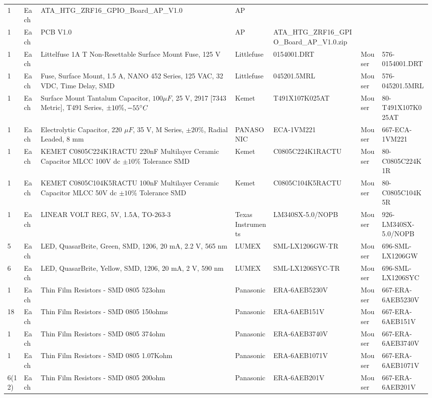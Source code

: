 \documentclass[12pt,a4paper,oneside]{article}
\begin{document}
\begin{landscape}
\begin{table}[H]
{\begin{tabular}{@{}lllllll@{}}
1 & Each & ATA\_HTG\_ZRF16\_GPIO\_Board\_AP\_V1.0 & AP\\
1 & Each & PCB V1.0 & AP & ATA\_HTG\_ZRF16\_GPIO\_Board\_AP\_V1.0.zip\\
1 & Each & Littelfuse 1A T Non-Resettable Surface Mount Fuse, 125 V & Littlefuse & 0154001.DRT & Mouser & 576-0154001.DRT\\
1 & Each & Fuse, Surface Mount, 1.5 A, NANO 452 Series, 125 VAC, 32 VDC, Time Delay, SMD & Littlefuse & 045201.5MRL & Mouser & 576-045201.5MRL\\
1 & Each & Surface Mount Tantalum Capacitor, $100 \mu F$, 25 V, 2917 [7343 Metric], T491 Series, $\pm 10\%, -55 \degree C$ & Kemet & T491X107K025AT & Mouser & 80-T491X107K025AT\\
1 & Each & Electrolytic Capacitor, 220 $\mu F$, 35 V, M Series, $\pm 20\%$, Radial Leaded, 8 mm & PANASONIC & ECA-1VM221 & Mouser & 667-ECA-1VM221\\
1 & Each & KEMET C0805C224K1RACTU 220nF Multilayer Ceramic Capacitor MLCC 100V dc $\pm 10\%$ Tolerance SMD & Kemet & C0805C224K1RACTU & Mouser & 80-C0805C224K1R\\
1 & Each & KEMET C0805C104K5RACTU 100nF Multilayer Ceramic Capacitor MLCC 50V dc $\pm 10\%$ Tolerance SMD & Kemet & C0805C104K5RACTU & Mouser & 80-C0805C104K5R\\
1 & Each &  LINEAR VOLT REG, 5V, 1.5A, TO-263-3 & Texas Instruments & LM340SX-5.0/NOPB & Mouser & 926-LM340SX-5.0/NOPB\\
5 & Each & LED, QuasarBrite, Green, SMD, 1206, 20 mA, 2.2 V, 565 nm & LUMEX & SML-LX1206GW-TR  & Mouser & 696-SML-LX1206GW\\
6 & Each & LED, QuasarBrite, Yellow, SMD, 1206, 20 mA, 2 V, 590 nm & LUMEX & SML-LX1206SYC-TR & Mouser & 696-SML-LX1206SYC\\
1 & Each & Thin Film Resistors - SMD 0805 523ohm & Panasonic & ERA-6AEB5230V & Mouser & 667-ERA-6AEB5230V\\
18 & Each & Thin Film Resistors - SMD 0805 150ohms & Panasonic & ERA-6AEB151V & Mouser & 667-ERA-6AEB151V\\
1 & Each & Thin Film Resistors - SMD 0805 374ohm  & Panasonic & ERA-6AEB3740V & Mouser & 667-ERA-6AEB3740V\\
1 & Each & Thin Film Resistors - SMD 0805 1.07Kohm  & Panasonic & ERA-6AEB1071V & Mouser & 667-ERA-6AEB1071V\\
6(12) & Each & Thin Film Resistors - SMD 0805 200ohm & Panasonic & ERA-6AEB201V & Mouser & 667-ERA-6AEB201V\\

\end{tabular}}
\end{table}
\end{landscape}
\end{document}
